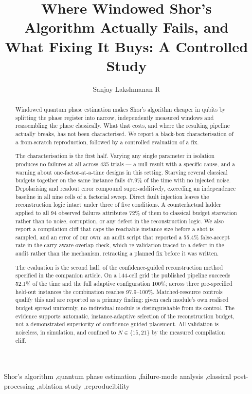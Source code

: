 \begin{frontmatter}


\title{Where Windowed Shor's Algorithm Actually Fails, and What Fixing
It Buys: A Controlled Study}

\author[inst1]{Sanjay Lakshmanan R}

\address[inst1]{Department of Computer Science and Engineering,
Amrita Vishwa Vidyapeetham, Chennai, India}

\begin{abstract}
Windowed quantum phase estimation makes Shor's algorithm cheaper in qubits
by splitting the phase register into narrow, independently measured windows
and reassembling the phase classically. What that costs, and where the
resulting pipeline actually breaks, has not been characterised. We report a
black-box characterisation of a from-scratch reproduction, followed by a
controlled evaluation of a fix.

The characterisation is the first half. Varying any single parameter in
isolation produces no failures at all across 435 trials --- a null result
with a specific cause, and a warning about one-factor-at-a-time designs in
this setting. Starving several classical budgets together on the same
instance fails 47.9\% of the time with no injected noise. Depolarising and
readout error compound super-additively, exceeding an independence baseline
in all nine cells of a factorial sweep. Direct fault injection leaves the
reconstruction logic intact under three of five conditions. A counterfactual
ladder applied to all 94 observed failures attributes 72\% of them to
classical budget starvation rather than to noise, corruption, or any defect
in the reconstruction logic. We also report a compilation cliff that caps
the reachable instance size before a shot is sampled, and an error of our
own: an audit script that reported a 55.4\% false-accept rate in the
carry-aware overlap check, which re-validation traced to a defect in the
audit rather than the mechanism, retracting a planned fix before it was
written.

The evaluation is the second half, of the confidence-guided reconstruction
method specified in the companion article. On a 144-cell grid the published
pipeline succeeds 52.1\% of the time and the full adaptive configuration
100\%; across three pre-specified held-out instances the combination
reaches 97.9--100\%. Matched-resource controls qualify this and are reported
as a primary finding: given each module's own realised budget spread
uniformly, no individual module is distinguishable from its control. The
evidence supports automatic, instance-adaptive selection of the
reconstruction budget, not a demonstrated superiority of confidence-guided
placement. All validation is noiseless, in simulation, and confined to
$N\in\{15,21\}$ by the measured compilation cliff.
\end{abstract}

\begin{keyword}
Shor's algorithm \sep quantum phase estimation \sep failure-mode analysis
\sep classical post-processing \sep ablation study \sep reproducibility
\end{keyword}

\end{frontmatter}
